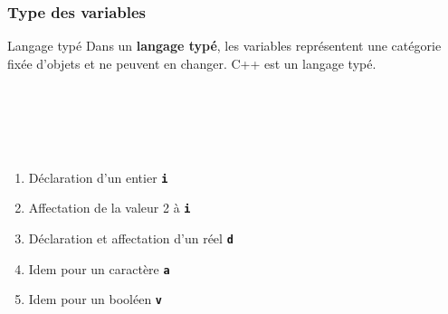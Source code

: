 \begin{frame}[fragile]
	\frametitle{Type des variables}
	\begin{block}{Langage typé}
  Dans un \textbf{langage typé}, les variables représentent une catégorie fixée d'objets et ne peuvent en changer. C++ est un langage typé.
	\end{block}
	\vfill
	\begin{minipage}{0.38\linewidth}
\\
\\
\\
\\
	\end{minipage}
	\hfill
	\begin{minipage}{0.58\linewidth}
		\begin{enumerate}
			\item<1> Déclaration d'un entier \texttt{\textbf{i}}
      \item<2> Affectation de la valeur 2 à \texttt{\textbf{i}}
			\item<3> Déclaration et affectation d'un réel \texttt{\textbf{d}}
      \item<4> Idem pour un caractère \texttt{\textbf{a}}
      \item<5> Idem pour un booléen \texttt{\textbf{v}}
		\end{enumerate}
	\end{minipage}
\end{frame}

